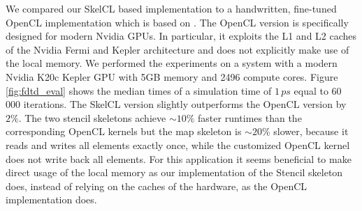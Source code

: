 We compared our SkelCL based implementation to a handwritten, fine-tuned OpenCL implementation which is based on \cite{Knitter2013}.
The OpenCL version is specifically designed for modern Nvidia GPUs.
In particular, it exploits the L1 and L2 caches of the Nvidia Fermi and Kepler architecture and does not explicitly make use of the local memory.
We performed the experiments on a system with a modern Nvidia K20c Kepler GPU with 5GB memory and 2496 compute cores.
Figure \ref{fig:fdtd_eval} shows the median times of a simulation time of $1\,ps$ equal to 60\, 000 iterations.
The SkelCL version slightly outperforms the OpenCL version by $2\%$.
The two stencil skeletons achieve ${\sim}10\%$ faster runtimes than the corresponding OpenCL kernels but the map skeleton is ${\sim}20\%$ slower, because it reads and writes all elements exactly once, while the customized OpenCL kernel does not write back all elements.
For this application it seems beneficial to make direct usage of the local memory as our implementation of the Stencil skeleton does, instead of relying on the caches of the hardware, as the OpenCL implementation does.

